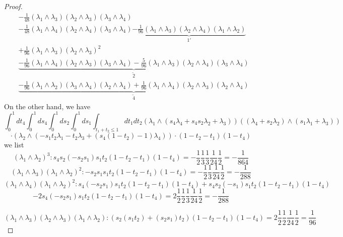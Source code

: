\documentclass[11pt]{amsart}
\theoremstyle{definition}
\theoremstyle{remark}
\numberwithin{equation}{section}
\begin{document}
\begin{proof}
\begin{align*}
& -\frac{1}{48}\left(\lambda_1 \wedge \lambda_3\right)\left(\lambda_2 \wedge \lambda_3\right)\left(\lambda_3 \wedge \lambda_4\right)\\
& -\frac{1}{48}\left(\lambda_1 \wedge \lambda_4\right)\left(\lambda_2 \wedge \lambda_4\right)\left(\lambda_3 \wedge \lambda_4\right)\underbrace{-\frac{1}{96}\left(\lambda_1 \wedge \lambda_3\right)\left(\lambda_2 \wedge \lambda_4\right)\left(\lambda_1 \wedge \lambda_2\right) }_{\boxed{1'}}\\
& +\frac{1}{96}\left(\lambda_1 \wedge \lambda_3\right)\left(\lambda_2 \wedge \lambda_3\right)^2\\
&\underbrace{-\frac{1}{96}\left(\lambda_1 \wedge \lambda_4\right)\left(\lambda_2 \wedge \lambda_3\right)\left(\lambda_3 \wedge \lambda_4\right) -\frac{5}{96}\left(\lambda_1 \wedge \lambda_3\right)\left(\lambda_2 \wedge \lambda_4\right)\left(\lambda_3 \wedge \lambda_4\right)}_{\boxed{\tilde{2}}}\\
&\underbrace{-\frac{1}{96}\left(\lambda_1 \wedge \lambda_2\right)\left(\lambda_3 \wedge \lambda_4\right)\left(\lambda_2 \wedge \lambda_4\right)+\frac{1}{96}\left(\lambda_1 \wedge \lambda_4\right)\left(\lambda_2 \wedge \lambda_3\right)\left(\lambda_2 \wedge \lambda_4\right)}_{\boxed{\tilde{4}}}
\end{align*}
On the other hand, we have
$$
\int^1_0dt_4\int^1_0ds_4\int^1_0ds_2\int^1_0ds_1\int_{t_1+t_2\leq 1}dt_1dt_2\left(\lambda_1\wedge (s_4\lambda_4+s_4s_2\lambda_2+\lambda_3) \right)\left( (\lambda_4+s_2\lambda_2)\wedge (s_1\lambda_1+\lambda_3)\right)
$$
$$
\cdot \left(\lambda_2\wedge (-s_1t_2\lambda_1-t_2\lambda_3+(s_4(1-t_2)-1)\lambda_4)\right)\cdot(1-t_2-t_1) (1-t_4)
$$
we list
$$
\left(\lambda_1 \wedge \lambda_2\right)^3:  s_4s_2(-s_2s_1)s_1t_2(1-t_2-t_1)(1-t_4)=-\frac{1}{2}\frac{1}{3}\frac{1}{3}\frac{1}{24}\frac{1}{2}=-\frac{1}{864}
$$
$$
\left(\lambda_1 \wedge \lambda_3\right)\left(\lambda_1 \wedge \lambda_2\right)^2:-s_2s_1s_1t_2(1-t_2-t_1)(1-t_4)=-\frac{1}{2}\frac{1}{3}\frac{1}{24}\frac{1}{2}=-\frac{1}{288}
$$
$$
\left(\lambda_1 \wedge \lambda_4\right)\left(\lambda_1 \wedge \lambda_2\right)^2:s_4(-s_2s_1)s_1t_2(1-t_2-t_1)(1-t_4)+s_4s_2(-s_1)s_1t_2(1-t_2-t_1)(1-t_4)
$$
$$
-2s_4(-s_2s_1)s_1t_2(1-t_2-t_1)(1-t_4)=2\frac{1}{2}\frac{1}{2}\frac{1}{3}\frac{1}{24}\frac{1}{2}=-\frac{1}{288}
$$

$$
\left(\lambda_1 \wedge \lambda_3\right)\left(\lambda_2 \wedge \lambda_3\right)\left(\lambda_1 \wedge \lambda_2\right):(s_2(s_1t_2)+(s_2s_1)t_2)(1-t_2-t_1)(1-t_4)=2\frac{1}{2}\frac{1}{2}\frac{1}{24}\frac{1}{2}=\frac{1}{96}
$$





\end{proof}
\end{document}
